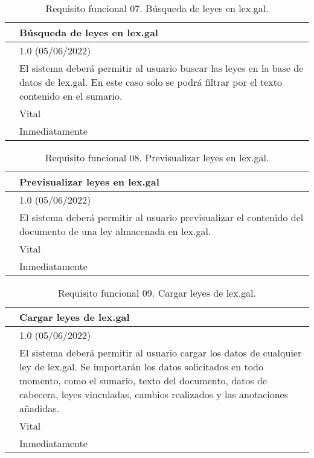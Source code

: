 \begin{table}[H]
\begin{center}
\begin{tabular}{|p{3cm}|p{10cm}|} \hline
\centering {\bf FRQ-07} & Búsqueda de leyes en lex.gal  \\ \hline\hline
\centering {\bf Versión} & 1.0 (05/06/2022) \\ \hline
\centering {\bf Descripción} & El sistema deberá permitir al usuario buscar las leyes en la base de datos de lex.gal. En este caso solo se podrá filtrar por el texto contenido en el sumario. \\ \hline
\centering {\bf Importancia} & Vital \\ \hline
\centering {\bf Urgencia} & Inmediatamente \\ \hline
\end{tabular}
\caption{Requisito funcional 07. Búsqueda de leyes en lex.gal.}
\label{enlaceFRQ7}
\end{center}
\end{table}

\begin{table}[H]
\begin{center}
\begin{tabular}{|p{3cm}|p{10cm}|} \hline
\centering {\bf FRQ-08} & Previsualizar leyes en lex.gal  \\ \hline\hline
\centering {\bf Versión} & 1.0 (05/06/2022) \\ \hline
\centering {\bf Descripción} & El sistema deberá permitir al usuario previsualizar el contenido del documento de una ley almacenada en lex.gal. \\ \hline
\centering {\bf Importancia} & Vital \\ \hline
\centering {\bf Urgencia} & Inmediatamente \\ \hline
\end{tabular}
\caption{Requisito funcional 08. Previsualizar leyes en lex.gal.}
\label{enlaceFRQ8}
\end{center}
\end{table}

\begin{table}[H]
\begin{center}
\begin{tabular}{|p{3cm}|p{10cm}|} \hline
\centering {\bf FRQ-09} & Cargar leyes de lex.gal  \\ \hline\hline
\centering {\bf Versión} & 1.0 (05/06/2022) \\ \hline
\centering {\bf Descripción} & El sistema deberá permitir al usuario cargar los datos de cualquier ley de lex.gal. Se importarán los datos solicitados en todo momento, como el sumario, texto del documento, datos de cabecera, leyes vinculadas, cambios realizados y las anotaciones añadidas. \\ \hline
\centering {\bf Importancia} & Vital \\ \hline
\centering {\bf Urgencia} & Inmediatamente \\ \hline
\end{tabular}
\caption{Requisito funcional 09. Cargar leyes de lex.gal.}
\label{enlaceFRQ9}
\end{center}
\end{table}

